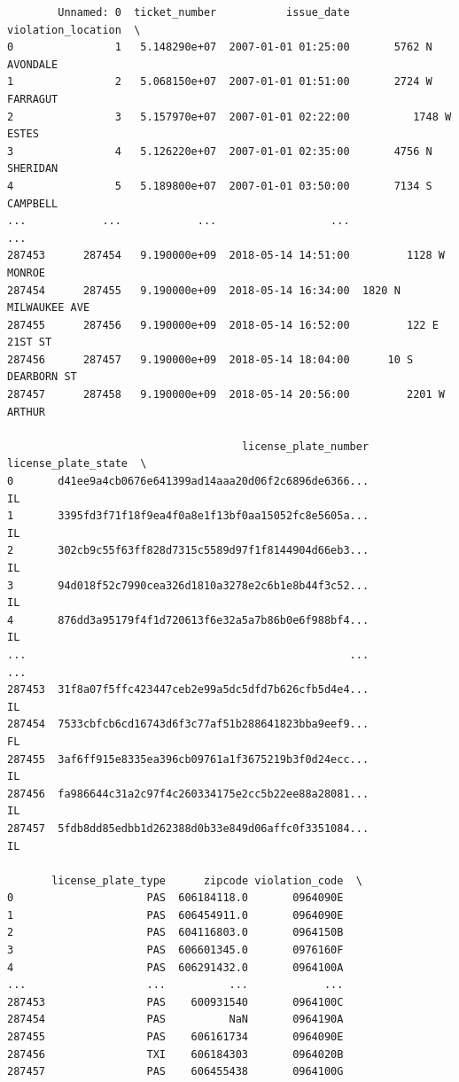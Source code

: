 \documentclass[
  letterpaper,
  DIV=11,
  numbers=noendperiod]{scrartcl}
\begin{document}
\begin{verbatim}
        Unnamed: 0  ticket_number           issue_date    violation_location  \
0                1   5.148290e+07  2007-01-01 01:25:00       5762 N AVONDALE   
1                2   5.068150e+07  2007-01-01 01:51:00       2724 W FARRAGUT   
2                3   5.157970e+07  2007-01-01 02:22:00          1748 W ESTES   
3                4   5.126220e+07  2007-01-01 02:35:00       4756 N SHERIDAN   
4                5   5.189800e+07  2007-01-01 03:50:00       7134 S CAMPBELL   
...            ...            ...                  ...                   ...   
287453      287454   9.190000e+09  2018-05-14 14:51:00         1128 W MONROE   
287454      287455   9.190000e+09  2018-05-14 16:34:00  1820 N MILWAUKEE AVE   
287455      287456   9.190000e+09  2018-05-14 16:52:00         122 E 21ST ST   
287456      287457   9.190000e+09  2018-05-14 18:04:00      10 S DEARBORN ST   
287457      287458   9.190000e+09  2018-05-14 20:56:00         2201 W ARTHUR   

                                     license_plate_number license_plate_state  \
0       d41ee9a4cb0676e641399ad14aaa20d06f2c6896de6366...                  IL   
1       3395fd3f71f18f9ea4f0a8e1f13bf0aa15052fc8e5605a...                  IL   
2       302cb9c55f63ff828d7315c5589d97f1f8144904d66eb3...                  IL   
3       94d018f52c7990cea326d1810a3278e2c6b1e8b44f3c52...                  IL   
4       876dd3a95179f4f1d720613f6e32a5a7b86b0e6f988bf4...                  IL   
...                                                   ...                 ...   
287453  31f8a07f5ffc423447ceb2e99a5dc5dfd7b626cfb5d4e4...                  IL   
287454  7533cbfcb6cd16743d6f3c77af51b288641823bba9eef9...                  FL   
287455  3af6ff915e8335ea396cb09761a1f3675219b3f0d24ecc...                  IL   
287456  fa986644c31a2c97f4c260334175e2cc5b22ee88a28081...                  IL   
287457  5fdb8dd85edbb1d262388d0b33e849d06affc0f3351084...                  IL   

       license_plate_type      zipcode violation_code  \
0                     PAS  606184118.0       0964090E   
1                     PAS  606454911.0       0964090E   
2                     PAS  604116803.0       0964150B   
3                     PAS  606601345.0       0976160F   
4                     PAS  606291432.0       0964100A   
...                   ...          ...            ...   
287453                PAS    600931540       0964100C   
287454                PAS          NaN       0964190A   
287455                PAS    606161734       0964090E   
287456                TXI    606184303       0964020B   
287457                PAS    606455438       0964100G   


\end{verbatim}
\end{document}
